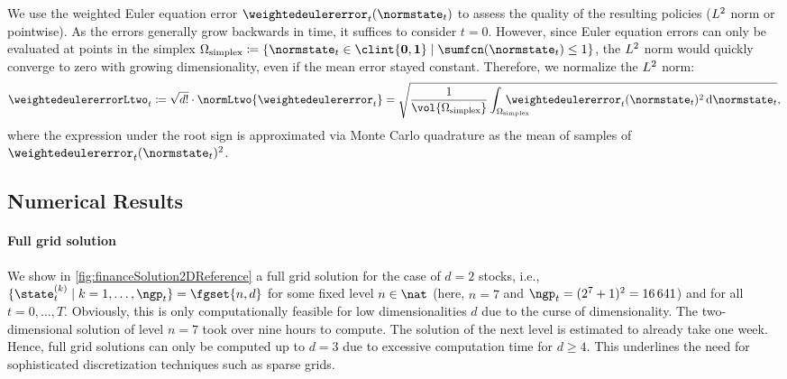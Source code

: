 We use the weighted Euler equation error
$\weightedeulererror_t(\normstate_t)$
to assess the quality of the resulting policies
($L^2$ norm or pointwise).
As the errors generally grow backwards in time,
it suffices to consider $t = 0$.
However, since Euler equation errors can only be evaluated at points in
the simplex
$
  \Omega_\mathrm{simplex}
  \ceq \{\normstate_t \in \clint{\*0, \*1} \mid \sumfcn(\normstate_t) \le 1\}
$, the $L^2$ norm would
quickly converge to zero with growing dimensionality, even if the mean error
stayed constant.
Therefore, we normalize the $L^2$ norm:
\begin{equation}
  \weightedeulererrorLtwo_t
  \ceq \sqrt{d!} \cdot \normLtwo{\weightedeulererror_t}
  = \sqrt{
    \frac{1}{\vol{\Omega_\mathrm{simplex}}}
    \int_{\mathrlap{\Omega_\mathrm{simplex}}\hphantom{\Omega}}
    \weightedeulererror_t(\normstate_t)^2 \diff{}\normstate_t
  },
\end{equation}
where the expression under the root sign is approximated
via Monte Carlo quadrature as the mean of samples
of $\weightedeulererror_t(\normstate_t)^2$.



\subsection{Numerical Results}
\label{sec:843results}

\paragraph{Full grid solution}

We show in \cref{fig:financeSolution2DReference}
a full grid solution for the case of $d = 2$ stocks,
i.e., $\{\state_t^{(k)} \mid k = 1, \dotsc, \ngp_t\} = \fgset{n,d}$
for some fixed level $n \in \nat$
(here, $n = 7$ and $\ngp_t = (2^7 + 1)^2 = \num{16641}$) and
for all $t = 0, \dotsc, T$.
Obviously, this is only computationally feasible
for low dimensionalities $d$ due to the curse of dimensionality.
The two-dimensional solution of level $n = 7$
took over nine hours to compute.
The solution of the next level is estimated to already take one week.
Hence, full grid solutions can only be computed up to $d = 3$
due to excessive computation time for $d \ge 4$.
This underlines the need for sophisticated
discretization techniques such as sparse grids.

